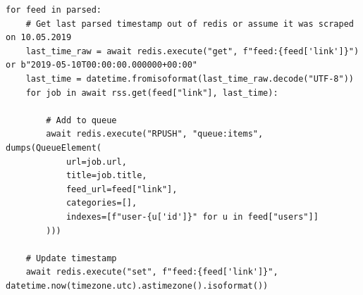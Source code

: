\begin{verbatim}
for feed in parsed:
    # Get last parsed timestamp out of redis or assume it was scraped on 10.05.2019
    last_time_raw = await redis.execute("get", f"feed:{feed['link']}") or b"2019-05-10T00:00:00.000000+00:00"
    last_time = datetime.fromisoformat(last_time_raw.decode("UTF-8"))
    for job in await rss.get(feed["link"], last_time):

        # Add to queue
        await redis.execute("RPUSH", "queue:items", dumps(QueueElement(
            url=job.url,
            title=job.title,
            feed_url=feed["link"],
            categories=[],
            indexes=[f"user-{u['id']}" for u in feed["users"]]
        )))

    # Update timestamp
    await redis.execute("set", f"feed:{feed['link']}", datetime.now(timezone.utc).astimezone().isoformat())
\end{verbatim}
